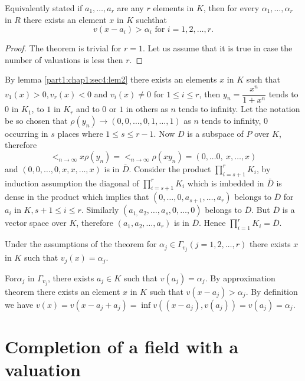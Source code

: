 Equivalently stated if $a_{1}, \ldots, a_{r}$ are any $r$ elements in
$K$, then for every $\alpha_{1}, \ldots, \alpha_{r}$ in $R$ there
exists an element $x$ in $K$ such\pageoriginale that  
$$
v(x - a_{i}) > \alpha_{i} \text { for } i = 1, 2, \ldots,  r.
$$
\begin{proof}
  The theorem is trivial for $r = 1$. Let us assume that it is true in
  case the number of valuations is less then $r$.  
\end{proof}

By lemma \ref{part1:chap1:sec4:lem2} there exists an elements $x$ in $K$ such that $v_{1}(x) >
0, v_{r}(x) < 0$ and $v_{i}(x) \neq 0$ for $1 \le i \le r$, then
$y_{n} = \dfrac{x^{n}}{1 + x^{n}}$ tends to $0$ in $K_{1}$, to $1$ in
$K_{r}$ and to $0$ or $1$ in others as $n$ tends to infinity. Let the
notation be so chosen that $\rho (y_{n}) \to (0, 0, \ldots,  0, 1,
\ldots, 1)$ as $n$ tends to infinity, $0$ occurring in $s$ places where
$1 \le s \le r - 1$. Now $D$ is a subspace of $P$ over $K$, therefore   
$$
\lt_{ n \to \infty} x \rho (y_{n}) =  \lt_{ n \to \infty} \rho (x y_{n}) =
(0, \ldots0, ~x,\ldots,x) 
$$
and $(0,0,\ldots, 0, x, x,\ldots, x)$ is in $\bar{D}$. Consider the
product $\prod\limits^{r}_{i=s+1} K_{i}$, by induction assumption the
diagonal of $\prod\limits^{r}_{i=s+1} K_{i}$ which is imbedded in
$\bar{D}$ is dense in the product which implies that $(0, \ldots, 0,
a_{s+1}, \ldots, a_{r})$ belongs to $\bar{D}$ for $a_{i}$ in $K, s + 1
\le i \le r$. Similarly $(a_{1,}a_{2}, \ldots,  a_{s}, 0, \ldots, 0)$
belongs to $\bar{D}$. But $\bar{D}$ is a vector space over $K$,
therefore $(a_{1}, a_{2}, \ldots,  a_{r})$ is in $\bar{D}$. Hence
$\prod\limits^{r}_{i=1} K_{i} = \bar{D}$. 

\begin{coro*}%
  Under the assumptions of the theorem for $\alpha_{j} \in
  \Gamma_{v_{j}} (j = 1, 2, \ldots,  r)$ there exists $x$ in $K$ such
  that $v_{j}(x) = \alpha_{j}$. 
\end{coro*}

For\pageoriginale $\alpha_{j}$ in $\Gamma_{v_{j}}$, there exists $a_{j} \in K$ such
that $v(a_{j}) = \alpha_{j}$. By approximation theorem there exists an
element $x$ in $K$ such that $v(x-a_{j}) > \alpha_{j}$. By definition
we have $v(x) = v(x - a_{j}+ a_{j}) = \inf v((x-a_{j}), v(a_{j})) =
v(a_{j}) = \alpha_{j}$. 

\section{Completion of a field with a valuation}\label{part1:chap1:sec5} %

